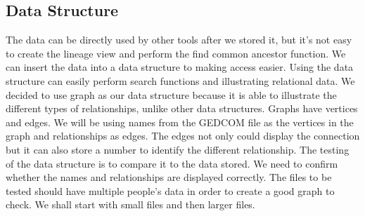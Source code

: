 \documentclass[onecolumn, draftclsnofoot, 10pt, compsoc]{IEEEtran}
\begin{document}
\subsection{Data Structure}
\begin{singlespace}
The data can be directly used by other tools after we stored it, but it's not easy to create the lineage view and perform the find common ancestor function. We can insert the data into a data structure to making access easier. Using the data structure can easily perform search functions and illustrating relational data. We decided to use graph as our data structure because it is able to illustrate the different types of relationships, unlike other data structures. Graphs have vertices and edges. We will be using names from the GEDCOM file as the vertices in the graph and relationships as edges. The edges not only could display the connection but it can also store a number to identify the different relationship. 
\newline
\newline
The testing of the data structure is to compare it to the data stored. We need to confirm whether the names and relationships are displayed correctly. The files to be tested should have multiple people's data in order to create a good graph to check. We shall start with small files and then larger files.
\end{singlespace}
\end{document}
